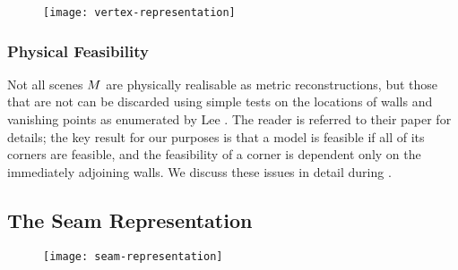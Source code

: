 \begin{figure}[tb]
  \centering
  \texttt{[image: vertex-representation]}
  \caption{}
  \label{fig:vertex-representation}
\end{figure}

\subsubsection{Physical Feasibility}

Not all scenes $\Scene$ are physically realisable
as metric reconstructions, but those that are not can be discarded
using simple tests on the locations of walls and vanishing points as
enumerated by Lee \etal \cite{Lee09}. The reader is referred to their
paper for details; the key result for our purposes is that a model is
feasible if all of its corners are feasible, and the feasibility of a
corner is dependent only on the immediately adjoining walls. We
discuss these issues in detail during .

\subsection{The Seam Representation}
\label{sec:seam-representation}

\begin{figure}[tb]%
  \centering
  \texttt{[image: seam-representation]}
  \caption{}
  \label{fig:seam-example}
\end{figure}

